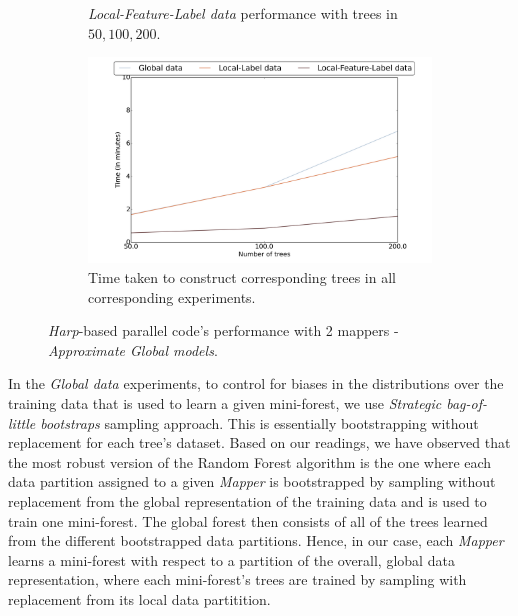 \documentclass{sig-alternate-05-2015}
\begin{document}
\begin{figure}[t]
\begin{subfigure}{.4\textwidth}
\caption{\textit{Local-Feature-Label data} performance with trees in ${50,100,200}$.}
\end{subfigure}
\begin{subfigure}{.4\textwidth}
\centering
\includegraphics[scale=0.2]{figures/2MapperTime.png}
\caption{Time taken to construct corresponding trees in all corresponding experiments.}
\end{subfigure}
\caption{\textit{Harp}-based parallel code's performance with 2 mappers - \textit{Approximate Global models}.}
\label{fig:approximateGlobalModels}
\end{figure}



In the \textit{Global data} experiments, to control for biases in the distributions over the training data that is used to learn a given mini-forest, we use \textit{Strategic bag-of-little bootstraps} sampling approach. This is essentially bootstrapping without replacement for each tree's dataset. Based on our readings, we have observed that the most robust version of the Random Forest algorithm is the one where each data partition assigned to a given \textit{Mapper} is bootstrapped by sampling without replacement from the global representation of the training data and is used to train one mini-forest. The global forest then consists of all of the trees learned from the different bootstrapped data partitions. Hence, in our case, each \textit{Mapper} learns a mini-forest with respect to a partition of the overall, global data representation, where each mini-forest's trees are trained by sampling with replacement from its local data partitition.
\end{document}
